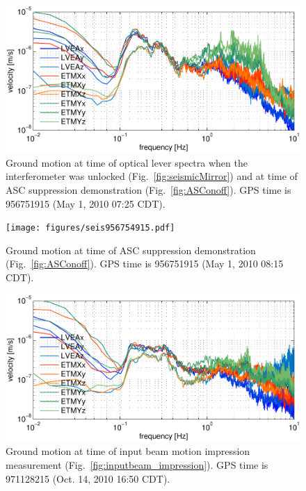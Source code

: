 \begin{figure}
\begin{centering}
\includegraphics[width=1.0\textwidth]{figures/seis956751915_nolock.pdf}
\caption[]{Ground motion at time of optical lever spectra when the
  interferometer was unlocked (Fig.~\ref{fig:seismicMirror}) and at
  time of ASC suppression demonstration (Fig.~\ref{fig:ASConoff}). GPS
  time is 956751915 (May 1, 2010 07:25 CDT).}
\label{fig:seismic_nolock}
\end{centering}
\end{figure}

\begin{figure}
\begin{centering}
\texttt{[image: figures/seis956754915.pdf]}
\caption[]{Ground motion at time of ASC suppression demonstration
  (Fig.~\ref{fig:ASConoff}). GPS time is 956751915 (May 1, 2010 08:15
  CDT).}
\label{fig:seismic_locked}
\end{centering}
\end{figure}

\begin{figure}
\begin{centering}
\includegraphics[width=1.0\textwidth]{figures/seis971128215_highWFSgain.pdf}
\caption[]{Ground motion at time of input beam motion impression
  measurement (Fig.~\ref{fig:inputbeam_impression}). GPS time is
  971128215 (Oct. 14, 2010 16:50 CDT).}
\label{fig:seismic_highgain}
\end{centering}
\end{figure}

